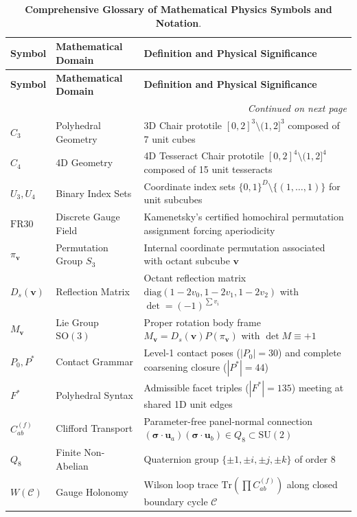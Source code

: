 \documentclass[11pt,a4paper]{article}
\theoremstyle{definition}
\newcommand{\SO}{\mathrm{SO}}
\newcommand{\SU}{\mathrm{SU}}
\newcommand{\Tr}{\mathrm{Tr}}
\newcommand{\diag}{\mathrm{diag}}
\begin{document}
\begin{longtable}{p{2.2cm}p{3.8cm}p{9.0cm}}
\caption{\textbf{Comprehensive Glossary of Mathematical Physics Symbols and Notation}.} \label{tab:glossary} \\
\toprule
\textbf{Symbol} & \textbf{Mathematical Domain} & \textbf{Definition and Physical Significance} \\
\midrule
\endfirsthead
\toprule
\textbf{Symbol} & \textbf{Mathematical Domain} & \textbf{Definition and Physical Significance} \\
\midrule
\endhead
\midrule
\multicolumn{3}{r}{\small\textit{Continued on next page}} \\
\bottomrule
\endfoot
\bottomrule
\endlastfoot
$C_3$ & Polyhedral Geometry & 3D Chair prototile $[0,2]^3 \setminus (1,2]^3$ composed of 7 unit cubes \\
$C_4$ & 4D Geometry & 4D Tesseract Chair prototile $[0,2]^4 \setminus (1,2]^4$ composed of 15 unit tesseracts \\
$U_3, U_4$ & Binary Index Sets & Coordinate index sets $\{0,1\}^D \setminus \{(1,\dots,1)\}$ for unit subcubes \\
$\mathrm{FR30}$ & Discrete Gauge Field & Kamenetsky's certified homochiral permutation assignment forcing aperiodicity \\
$\pi_{\mathbf{v}}$ & Permutation Group $S_3$ & Internal coordinate permutation associated with octant subcube $\mathbf{v}$ \\
$D_s(\mathbf{v})$ & Reflection Matrix & Octant reflection matrix $\diag(1-2v_0, 1-2v_1, 1-2v_2)$ with $\det = (-1)^{\sum v_i}$ \\
$M_{\mathbf{v}}$ & Lie Group $\SO(3)$ & Proper rotation body frame $M_{\mathbf{v}} = D_s(\mathbf{v}) P(\pi_{\mathbf{v}})$ with $\det M \equiv +1$ \\
$P_0, P^*$ & Contact Grammar & Level-1 contact poses ($|P_0|=30$) and complete coarsening closure ($|P^*|=44$) \\
$F^*$ & Polyhedral Syntax & Admissible facet triples ($|F^*|=135$) meeting at shared 1D unit edges \\
$C_{ab}^{(f)}$ & Clifford Transport & Parameter-free panel-normal connection $(\boldsymbol{\sigma}\cdot\mathbf{u}_a)(\boldsymbol{\sigma}\cdot\mathbf{u}_b) \in Q_8 \subset \SU(2)$ \\
$Q_8$ & Finite Non-Abelian & Quaternion group $\{\pm 1, \pm i, \pm j, \pm k\}$ of order 8 \\
$W(\mathcal{C})$ & Gauge Holonomy & Wilson loop trace $\Tr\left(\prod C_{ab}^{(f)}\right)$ along closed boundary cycle $\mathcal{C}$ \\

\end{longtable}
\end{document}
